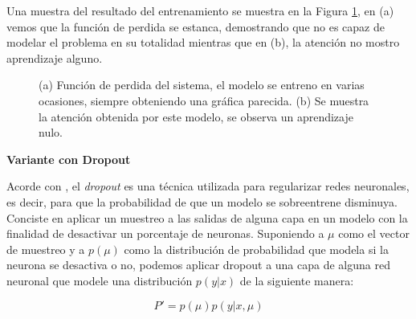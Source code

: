 

Una muestra del resultado del entrenamiento se muestra en la Figura \ref{fig:gru-bad}, en (a) vemos que la función de perdida se estanca, demostrando que no es capaz de modelar el problema en su totalidad mientras que en (b), la atención no mostro aprendizaje alguno.

\begin{figure}[H]
    \centering
    \caption{(a) Función de perdida del sistema, el modelo se entreno en varias ocasiones, siempre obteniendo una gráfica parecida. (b) Se muestra la atención obtenida por este modelo, se observa un aprendizaje nulo.}
    \label{fig:gru-bad}
\end{figure}


\vspace{1em}
\textbf{Variante con Dropout}
\vspace{1em}

Acorde con \cite{deeplearningbook}, el \textit{dropout} es una técnica utilizada para regularizar redes neuronales, es decir, para que la probabilidad de que un modelo se sobreentrene disminuya. Conciste en aplicar un muestreo a las salidas de alguna capa en un modelo con la finalidad de desactivar un porcentaje de neuronas. Suponiendo a $\mu$ como el vector de muestreo y a $p(\mu)$ como la distribución de probabilidad que modela si la neurona se desactiva o no, podemos aplicar dropout a una capa de alguna red neuronal que modele una distribución $p(y|x)$ de la siguiente manera:

\begin{equation}
    P' = p(\mu)p(y|x,\mu)
\end{equation}

